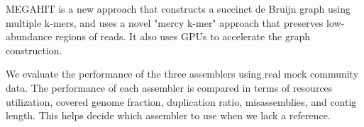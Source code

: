 \documentclass[10pt,a4paper,twocolumn]{article}
\begin{document}
MEGAHIT \cite{megahit} is a new approach that constructs a succinct de
Bruijn graph using multiple k-mers, and uses a novel "mercy k-mer"
approach that preserves low-abundance regions of reads. It also uses
GPUs to accelerate the graph construction.

We evaluate the performance of the three assemblers using real mock
community data. The performance of each assembler is compared in terms
of resources utilization, covered genome fraction, duplication ratio,
misassemblies, and contig length. This helps decide which assembler to
use when we lack a reference.





 
\end{document}

